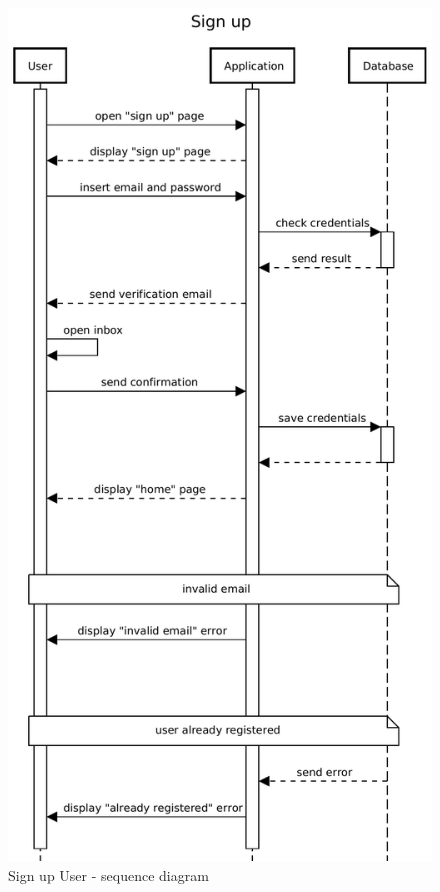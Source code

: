 \begin{figure}[H]
    \centering
    \includegraphics[scale=0.5]{Images/Sequence diagrams/User - sign up.pdf}

    \caption{Sign up User - sequence diagram}
    \label{fig:fig:seq_diag_sign_up}
\end{figure}

